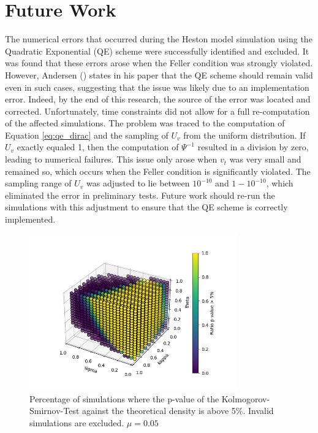 \section{Future Work}

The numerical errors that occurred during the Heston model simulation using the Quadratic Exponential (QE) scheme were successfully identified and excluded. It was found that these errors arose when the Feller condition was strongly violated. However, Andersen (\citeyear{andersenEfficientSimulationHeston2007}) states in his paper that the QE scheme should remain valid even in such cases, suggesting that the issue was likely due to an implementation error. Indeed, by the end of this research, the source of the error was located and corrected. Unfortunately, time constraints did not allow for a full re-computation of the affected simulations. The problem was traced to the computation of Equation \eqref{eq:qe_dirac} and the sampling of $U_v$ from the uniform distribution. If $U_v$ exactly equaled 1, then the computation of $\Psi^{-1}$ resulted in a division by zero, leading to numerical failures. This issue only arose when $v_t$ was very small and remained so, which occurs when the Feller condition is significantly violated. The sampling range of $U_v$ was adjusted to lie between $10^{-10}$ and $1-10^{-10}$, which eliminated the error in preliminary tests. Future work should re-run the simulations with this adjustment to ensure that the QE scheme is correctly implemented.

\begin{figure}
    \centering
    \includegraphics[width=0.8\textwidth]{img/GC_cum_KS_3d_p_value_sigma_kappa_theta.png}
    \caption{Percentage of simulations where the p-value of the Kolmogorov-Smirnov-Test against the theoretical density is above 5\%. Invalid simulations are excluded. $\mu=0.05$}
    \label{fig:GC_cum_KS_3d_p_value_sigma_kappa_theta_mu005}
\end{figure}

